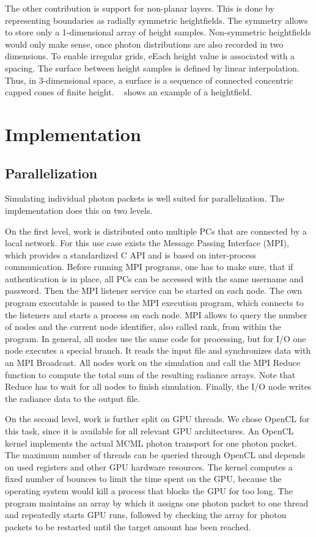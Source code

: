 \documentclass[]{article}
\begin{document}
The other contribution is support for non-planar layers. This is done by representing boundaries as radially symmetric heightfields. The symmetry allows to store only a 1-dimensional array of height samples. Non-symmetric heightfields would only make sense, once photon distributions are also recorded in two dimensions. To enable irregular grids, eEach height value is associated with a spacing. The surface between height samples is defined by linear interpolation. Thus, in 3-dimensional space, a surface is a sequence of connected concentric capped cones of finite height. ~ shows an example of a heightfield.

\section{Implementation}
\label{impl}

\subsection{Parallelization}

Simulating individual photon packets is well suited for parallelization. The implementation does this on two levels.

On the first level, work is distributed onto multiple PCs that are connected by a local network. For this use case exists the Message Passing Interface (MPI), which provides a standardized C API and is based on inter-process communication. Before running MPI programs, one has to make sure, that if authentication is in place, all PCs can be accessed with the same username and password. Then the MPI listener service can be started on each node. The own program executable is passed to the MPI execution program, which connects to the listeners and starts a process on each node. MPI allows to query the number of nodes and the current node identifier, also called rank, from within the program. In general, all nodes use the same code for processing, but for I/O one node executes a special branch. It reads the input file and synchronizes data with an MPI Broadcast. All nodes work on the simulation and call the MPI Reduce function to compute the total sum of the resulting radiance arrays. Note that Reduce has to wait for all nodes to finish simulation. Finally, the I/O node writes the radiance data to the output file.

On the second level, work is further split on GPU threads. We chose OpenCL for this task, since it is available for all relevant GPU architectures. An OpenCL kernel implements the actual MCML photon transport for one photon packet. The maximum number of threads can be queried through OpenCL and depends on used registers and other GPU hardware resources. The kernel computes a fixed number of bounces to limit the time spent on the GPU, because the operating system would kill a process that blocks the GPU for too long. The program maintains an array by which it assigns one photon packet to one thread and repeatedly starts GPU runs, followed by checking the array for photon packets to be restarted until the target amount has been reached.
\end{document}
